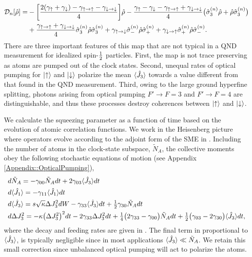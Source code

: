 \documentclass[preprint, aps,pra,onecolumn]{revtex4-1} %
\newcommand{\half}{\smallfrac{1}{2}}
\newcommand{\varz}{\Delta J_3^2}
\newcommand{\jz}{\hat{J}_3}
\newcommand{\NA}{\tilde{N}_A}
\newcommand{\gammauu}{\gamma_{\uparrow \rightarrow \uparrow}}
\newcommand{\gammadd}{\gamma_{\downarrow \rightarrow \downarrow}}
\newcommand{\gammaud}{\gamma_{\uparrow \rightarrow \downarrow}}
\newcommand{\gammadu}{\gamma_{\downarrow \rightarrow \uparrow}}
\newcommand{\gammau}{\gamma_{\uparrow}}
\newcommand{\gammad}{\gamma_{\downarrow}}
\begin{document}
	\begin{align} \label{Eq::OpticalPumpingMapSchr}
		\mathcal{D}_n [\hat{\rho}] 
				=& - \bigg[ \frac{2(\gammau+ \gammad) - \gammauu - \gammadd}{4} \bigg] \hat{\rho} - \frac{ \gammau - \gammad - \gammauu + \gammadd }{4} \big( \hat{\sigma}_3^{(n)} \hat{\rho}+ \hat{\rho} \hat{\sigma}_3^{(n)} \big) \nn \\
		&+ \frac{\gammauu+\gammadd}{4} \hat{\sigma}_ 3^{(n)}\hat{\rho} \hat{\sigma}_3^{(n)} + \gammaud  \hat{\sigma}_-^{(n)} \hat{\rho} \hat{\sigma}_+^{(n)} + \gammadu  \hat{\sigma}_+^{(n)} \hat{\rho} \hat{\sigma}_- ^{(n)}.   
	\end{align} 
There are three important features of this map that are not typical in a QND measurement for idealized spin-$\half$ particles.  
First, the map is not trace preserving as atoms are pumped out of the clock states. 
Second, unequal rates of optical pumping for $\lvert{\uparrow}\rangle$ and $\lvert{\downarrow}\rangle$ polarize the mean $\expt{\jz}$ towards a value different from that found in the QND measurement. 
Third, owing to the large ground hyperfine splitting, photons arising from optical pumping $F' \rightarrow F=3$ and $F' \rightarrow F=4$ are distinguishable, and thus these processes destroy coherences between $\lvert{\uparrow}\rangle$ and $\lvert{\downarrow}\rangle$.

We calculate the squeezing parameter as a function of time based on the evolution of atomic correlation functions. We work in the Heisenberg picture where operators evolve according to the adjoint form of the SME in .  Including the number of atoms in the clock-state subspace, $ \NA $, the collective moments obey the following stochastic equations of motion (see Appendix \ref{Appendix::OpticalPumping}),
	\begin{align} 
		&d \NA = -\gamma_{00} \NA  dt + 2\gamma_{03} \expt{\hat{J}_3} dt \label{Eq::NA}\\
		&d \expt{\hat{J}_1}  = -\gamma_{11} \expt{\hat{J}_1} dt  \label{Eq::MeanSpinDecay} \\
		&d \expt{\hat{J}_3}  = s\sqrt{\kappa} \varz dW -\gamma_{33} \expt{\hat{J}_3}dt + \smallfrac{1}{2}\gamma_{30} \NA dt   \\
		&d \varz  = - \kappa \big(\varz\big)^2 dt- 2 \gamma_{33} \varz dt + \smallfrac{1}{4} \big( 2\gamma_{33}-\gamma_{00} \big) \NA dt + \smallfrac{1}{2} \big( \gamma_{03} - 2 \gamma_{30} \big) \expt{\hat{J}_3} dt,   \label{Eq::varJz} 
	\end{align}
where the decay and feeding rates are given in .  
The final term in  proportional to $\langle{\hat{J}_3}\rangle$, is typically negligible since in most applications $\expt{\hat{J}_3} \ll \NA$.  
We retain this small correction since unbalanced optical pumping will act to polarize the atoms.  
\end{document}
